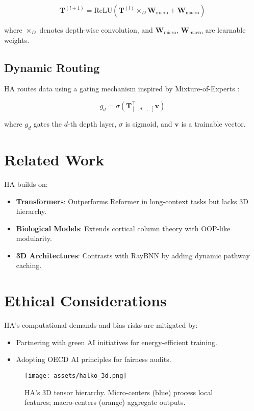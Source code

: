 \documentclass{article}
\begin{document}
\begin{equation}
\mathbf{T}^{(l+1)} = \text{ReLU}\left(\mathbf{T}^{(l)} \times_{D} \mathbf{W}_{\text{micro}} + \mathbf{W}_{\text{macro}} \right)
\end{equation}

where $\times_{D}$ denotes depth-wise convolution, and $\mathbf{W}_{\text{micro}}$, $\mathbf{W}_{\text{macro}}$ are learnable weights.

\subsection{Dynamic Routing}
HA routes data using a gating mechanism inspired by Mixture-of-Experts \cite{lepikhin2020gshard}:

\begin{equation}
g_d = \sigma\left(\mathbf{T}_{[:,d,:,:]}^\top \mathbf{v}\right)
\end{equation}

where $g_d$ gates the $d$-th depth layer, $\sigma$ is sigmoid, and $\mathbf{v}$ is a trainable vector.

\section{Related Work}
HA builds on:
\begin{itemize}
    \item \textbf{Transformers}: Outperforms Reformer \cite{kitaev2020reformer} in long-context tasks but lacks 3D hierarchy.
    \item \textbf{Biological Models}: Extends cortical column theory \cite{stoianov2022cortical} with OOP-like modularity.
    \item \textbf{3D Architectures}: Contrasts with RayBNN \cite{anonymous2023raybnn} by adding dynamic pathway caching.
\end{itemize}

\section{Ethical Considerations}
HA’s computational demands and bias risks are mitigated by:
\begin{itemize}
    \item Partnering with green AI initiatives for energy-efficient training.
    \item Adopting OECD AI principles \cite{oecd2019ai} for fairness audits.
\end{itemize}

\begin{figure}[ht]
\centering
\texttt{[image: assets/halko\_3d.png]}
\caption{HA’s 3D tensor hierarchy. Micro-centers (blue) process local features; macro-centers (orange) aggregate outputs.}
\label{fig:architecture}
\end{figure}



\end{document}
